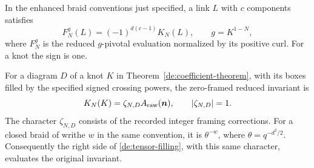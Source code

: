 \begin{theorem}
\label{de:invariant-normalization}
In the enhanced braid conventions just specified, a link \(L\)
with \(c\) components satisfies
\begin{equation}\label{de:enhanced-comparison}
 F_N^g(L)=(-1)^{d(c-1)}K_N(L),
 \qquad g=K^{1-N},
\end{equation}
where \(F_N^g\) is the reduced \(g\)-pivotal evaluation normalized
by its positive curl. For a knot the sign is one.

For a diagram \(D\) of a knot \(K\) in
Theorem~\ref{de:coefficient-theorem}, with its boxes filled by
the specified signed crossing powers, the zero-framed reduced
invariant is
\begin{equation}\label{de:raw-invariant}
 K_N(K)=\zeta_{N,D}A_{\rm raw}(\boldsymbol n),
              \qquad |\zeta_{N,D}|=1.
\end{equation}
The character \(\zeta_{N,D}\) consists of the recorded integer
framing corrections. For a closed braid of writhe \(w\) in the
same convention, it is \(\theta^{-w}\), where
\(\theta=q^{-d^2/2}\).
Consequently the right side of \eqref{de:tensor-filling}, with
this same character, evaluates the original invariant.
\end{theorem}

